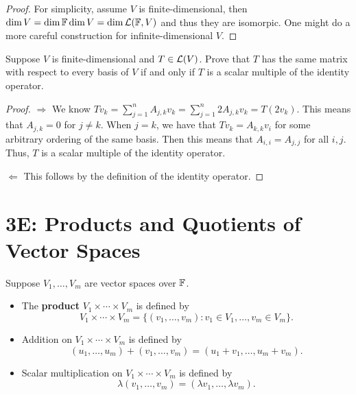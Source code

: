 \documentclass{extarticle}
\begin{document}
\begin{proof}
For simplicity, assume \(V\) is finite-dimensional, then \(\dim V = \dim \mathbb{F} \dim V = \dim \mathcal{L}(\mathbb{F}, V)\) and 
thus they are isomorpic. One might do a more careful construction for infinite-dimensional \(V\). 
\end{proof}


\begin{problem}{19}
    Suppose \(V\) is finite-dimensional and \(T \in \mathcal{L}(V)\). Prove that \(T\) has the same matrix with 
    respect to every basis of \(V\) if and only if \(T\) is a scalar multiple of the identity operator.
\end{problem}

\begin{proof}
\(\Rightarrow\) We know \(T v_k = \sum_{j=1}^{n} A_{j, k} v_k = \sum_{j=1}^{n} 2 A_{j, k} v_k
= T (2v_k)\). This means that \(A_{j, k} = 0\) for \(j \neq k\). When \(j = k\), we have that 
\(T v_k = A_{k, k} v_i\) for some arbitrary ordering of the same basis. Then this means that 
\(A_{i, i} = A_{j, j}\) for all \(i, j\). Thus, \(T\) is a scalar multiple of the identity operator. 

\(\Leftarrow\) This follows by the definition of the identity operator. 
\end{proof}

\newpage 

\section*{3E: Products and Quotients of Vector Spaces}

\begin{definition}
    Suppose \(V_1, \ldots, V_m\) are vector spaces over \(\mathbb{F}\). 
    \begin{itemize}
        \item The \textbf{product} \(V_1 \times \cdots \times V_m\) is defined by 
        \[V_1 \times \cdots \times V_m = \{(v_1, \ldots, v_m) \colon 
        v_1 \in V_1, \ldots, v_m \in V_m\}.\]
        \item Addition on \(V_1 \times \cdots \times V_m\) is defined by 
        \[(u_1, \ldots, u_m) + (v_1, \ldots, v_m) = (u_1 + v_1, \ldots, u_m + v_m).\]
        \item Scalar multiplication on \(V_1 \times \cdots \times V_m\) is defined by 
        \[\lambda(v_1, \ldots, v_m) = (\lambda v_1, \ldots, \lambda v_m).\]
    \end{itemize}
\end{definition}
\end{document}
